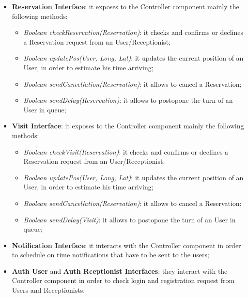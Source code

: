 \begin{itemize}
\item \textbf{Reservation Interface}: it exposes to the Controller component mainly the following methods:
\begin{itemize}
\item \textit{Boolean checkReservation(Reservation)}: it checks and confirms or declines a Reservation request from an User/Receptionist;
\item \textit{Boolean updatePos(User, Long, Lat)}: it updates the current position of an User, in order to estimate his time arriving;
\item \textit{Boolean sendCancellation(Reservation)}: it allows to cancel a Reservation; 
\item \textit{Boolean sendDelay(Reservation)}: it allows to postopone the turn of an User in queue;
\end{itemize}



\item \textbf{Visit Interface}: it exposes to the Controller component mainly the following methods:
\begin{itemize}
\item \textit{Boolean checkVisit(Reservation)}: it checks and confirms or declines a Reservation request from an User/Receptionist;
\item \textit{Boolean updatePos(User, Long, Lat)}: it updates the current position of an User, in order to estimate his time arriving;
\item \textit{Boolean sendCancellation(Reservation)}: it allows to cancel a Reservation; 
\item \textit{Boolean sendDelay(Visit)}: it allows to postopone the turn of an User in queue;
\end{itemize}


\item \textbf{Notification Interface}: it interacts with the Controller component in order to schedule on time notifications that have to be sent to the users;

\item \textbf{Auth User} and \textbf{Auth Rceptionist Interfaces}: they interact with the Controller component in order to check login and registration request from Users and Receptionists;


\end{itemize}
